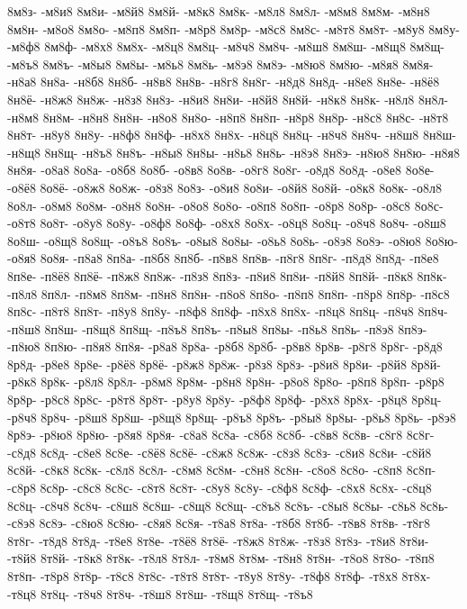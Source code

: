 {8м8з-
-м8и8
8м8и-
-м8й8
8м8й-
-м8к8
8м8к-
-м8л8
8м8л-
-м8м8
8м8м-
-м8н8
8м8н-
-м8о8
8м8о-
-м8п8
8м8п-
-м8р8
8м8р-
-м8с8
8м8с-
-м8т8
8м8т-
-м8у8
8м8у-
-м8ф8
8м8ф-
-м8х8
8м8х-
-м8ц8
8м8ц-
-м8ч8
8м8ч-
-м8ш8
8м8ш-
-м8щ8
8м8щ-
-м8ъ8
8м8ъ-
-м8ы8
8м8ы-
-м8ь8
8м8ь-
-м8э8
8м8э-
-м8ю8
8м8ю-
-м8я8
8м8я-
-н8а8
8н8а-
-н8б8
8н8б-
-н8в8
8н8в-
-н8г8
8н8г-
-н8д8
8н8д-
-н8е8
8н8е-
-н8ё8
8н8ё-
-н8ж8
8н8ж-
-н8з8
8н8з-
-н8и8
8н8и-
-н8й8
8н8й-
-н8к8
8н8к-
-н8л8
8н8л-
-н8м8
8н8м-
-н8н8
8н8н-
-н8о8
8н8о-
-н8п8
8н8п-
-н8р8
8н8р-
-н8с8
8н8с-
-н8т8
8н8т-
-н8у8
8н8у-
-н8ф8
8н8ф-
-н8х8
8н8х-
-н8ц8
8н8ц-
-н8ч8
8н8ч-
-н8ш8
8н8ш-
-н8щ8
8н8щ-
-н8ъ8
8н8ъ-
-н8ы8
8н8ы-
-н8ь8
8н8ь-
-н8э8
8н8э-
-н8ю8
8н8ю-
-н8я8
8н8я-
-о8а8
8о8а-
-о8б8
8о8б-
-о8в8
8о8в-
-о8г8
8о8г-
-о8д8
8о8д-
-о8е8
8о8е-
-о8ё8
8о8ё-
-о8ж8
8о8ж-
-о8з8
8о8з-
-о8и8
8о8и-
-о8й8
8о8й-
-о8к8
8о8к-
-о8л8
8о8л-
-о8м8
8о8м-
-о8н8
8о8н-
-о8о8
8о8о-
-о8п8
8о8п-
-о8р8
8о8р-
-о8с8
8о8с-
-о8т8
8о8т-
-о8у8
8о8у-
-о8ф8
8о8ф-
-о8х8
8о8х-
-о8ц8
8о8ц-
-о8ч8
8о8ч-
-о8ш8
8о8ш-
-о8щ8
8о8щ-
-о8ъ8
8о8ъ-
-о8ы8
8о8ы-
-о8ь8
8о8ь-
-о8э8
8о8э-
-о8ю8
8о8ю-
-о8я8
8о8я-
-п8а8
8п8а-
-п8б8
8п8б-
-п8в8
8п8в-
-п8г8
8п8г-
-п8д8
8п8д-
-п8е8
8п8е-
-п8ё8
8п8ё-
-п8ж8
8п8ж-
-п8з8
8п8з-
-п8и8
8п8и-
-п8й8
8п8й-
-п8к8
8п8к-
-п8л8
8п8л-
-п8м8
8п8м-
-п8н8
8п8н-
-п8о8
8п8о-
-п8п8
8п8п-
-п8р8
8п8р-
-п8с8
8п8с-
-п8т8
8п8т-
-п8у8
8п8у-
-п8ф8
8п8ф-
-п8х8
8п8х-
-п8ц8
8п8ц-
-п8ч8
8п8ч-
-п8ш8
8п8ш-
-п8щ8
8п8щ-
-п8ъ8
8п8ъ-
-п8ы8
8п8ы-
-п8ь8
8п8ь-
-п8э8
8п8э-
-п8ю8
8п8ю-
-п8я8
8п8я-
-р8а8
8р8а-
-р8б8
8р8б-
-р8в8
8р8в-
-р8г8
8р8г-
-р8д8
8р8д-
-р8е8
8р8е-
-р8ё8
8р8ё-
-р8ж8
8р8ж-
-р8з8
8р8з-
-р8и8
8р8и-
-р8й8
8р8й-
-р8к8
8р8к-
-р8л8
8р8л-
-р8м8
8р8м-
-р8н8
8р8н-
-р8о8
8р8о-
-р8п8
8р8п-
-р8р8
8р8р-
-р8с8
8р8с-
-р8т8
8р8т-
-р8у8
8р8у-
-р8ф8
8р8ф-
-р8х8
8р8х-
-р8ц8
8р8ц-
-р8ч8
8р8ч-
-р8ш8
8р8ш-
-р8щ8
8р8щ-
-р8ъ8
8р8ъ-
-р8ы8
8р8ы-
-р8ь8
8р8ь-
-р8э8
8р8э-
-р8ю8
8р8ю-
-р8я8
8р8я-
-с8а8
8с8а-
-с8б8
8с8б-
-с8в8
8с8в-
-с8г8
8с8г-
-с8д8
8с8д-
-с8е8
8с8е-
-с8ё8
8с8ё-
-с8ж8
8с8ж-
-с8з8
8с8з-
-с8и8
8с8и-
-с8й8
8с8й-
-с8к8
8с8к-
-с8л8
8с8л-
-с8м8
8с8м-
-с8н8
8с8н-
-с8о8
8с8о-
-с8п8
8с8п-
-с8р8
8с8р-
-с8с8
8с8с-
-с8т8
8с8т-
-с8у8
8с8у-
-с8ф8
8с8ф-
-с8х8
8с8х-
-с8ц8
8с8ц-
-с8ч8
8с8ч-
-с8ш8
8с8ш-
-с8щ8
8с8щ-
-с8ъ8
8с8ъ-
-с8ы8
8с8ы-
-с8ь8
8с8ь-
-с8э8
8с8э-
-с8ю8
8с8ю-
-с8я8
8с8я-
-т8а8
8т8а-
-т8б8
8т8б-
-т8в8
8т8в-
-т8г8
8т8г-
-т8д8
8т8д-
-т8е8
8т8е-
-т8ё8
8т8ё-
-т8ж8
8т8ж-
-т8з8
8т8з-
-т8и8
8т8и-
-т8й8
8т8й-
-т8к8
8т8к-
-т8л8
8т8л-
-т8м8
8т8м-
-т8н8
8т8н-
-т8о8
8т8о-
-т8п8
8т8п-
-т8р8
8т8р-
-т8с8
8т8с-
-т8т8
8т8т-
-т8у8
8т8у-
-т8ф8
8т8ф-
-т8х8
8т8х-
-т8ц8
8т8ц-
-т8ч8
8т8ч-
-т8ш8
8т8ш-
-т8щ8
8т8щ-
-т8ъ8
}
